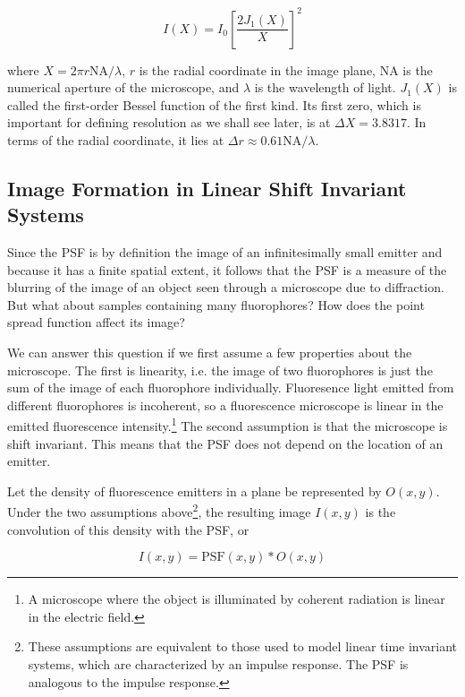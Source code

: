 \documentclass[10pt,a4paper,oneside]{book}
\begin{document}
\begin{equation}
    I \left(X\right) = I_{0} \left[ \frac{2 J_{1}\left(X\right)}{X} \right]^2
\end{equation}

\noindent where $ X = 2 \pi r \text{NA} / \lambda $, $r$ is the radial coordinate in the image plane, $\text{NA}$ is the numerical aperture of the microscope, and $\lambda$ is the wavelength of light. $J_{1}\left(X\right)$ is called the first-order Bessel function of the first kind. Its first zero, which is important for defining resolution as we shall see later, is at $\Delta X = 3.8317$. In terms of the radial coordinate, it lies at $\Delta r \approx 0.61 \text{NA} / \lambda$.

\subsection{Image Formation in Linear Shift Invariant Systems}

Since the PSF is by definition the image of an infinitesimally small emitter and because it has a finite spatial extent, it follows that the PSF is a measure of the blurring of the image of an object seen through a microscope due to diffraction. But what about samples containing many fluorophores? How does the point spread function affect its image?

We can answer this question if we first assume a few properties about the microscope. The first is linearity, i.e. the image of two fluorophores is just the sum of the image of each fluorophore individually. Fluoresence light emitted from different fluorophores is incoherent, so a fluorescence microscope is linear in the emitted fluorescence intensity.\footnote{A microscope where the object is illuminated by coherent radiation is linear in the electric field.} The second assumption is that the microscope is shift invariant. This means that the PSF does not depend on the location of an emitter. 

Let the density of fluorescence emitters in a plane be represented by $O \left(x, y\right)$. Under the two assumptions above\footnote{These assumptions are equivalent to those used to model linear time invariant systems, which are characterized by an impulse response. The PSF is analogous to the impulse response.}, the resulting image $I \left(x, y\right)$ is the convolution of this density with the PSF, or

\begin{equation} \label{eq:image-formation}
    I \left(x, y\right) = \text{PSF} \left(x, y\right) \ast O \left(x, y\right)
\end{equation}
\end{document}
